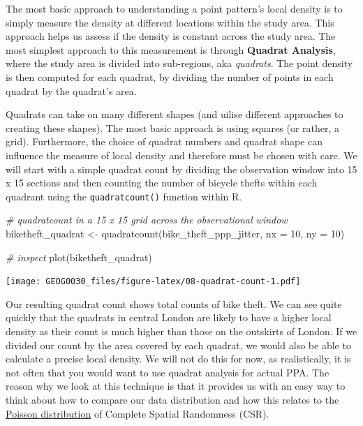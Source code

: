 \documentclass[
]{book}
\newenvironment{Shaded}{\begin{snugshade}}{\end{snugshade}}
\newcommand{\AttributeTok}[1]{\textcolor[rgb]{0.77,0.63,0.00}{#1}}
\newcommand{\CommentTok}[1]{\textcolor[rgb]{0.56,0.35,0.01}{\textit{#1}}}
\newcommand{\DecValTok}[1]{\textcolor[rgb]{0.00,0.00,0.81}{#1}}
\newcommand{\FunctionTok}[1]{\textcolor[rgb]{0.00,0.00,0.00}{#1}}
\newcommand{\NormalTok}[1]{#1}
\newcommand{\OtherTok}[1]{\textcolor[rgb]{0.56,0.35,0.01}{#1}}
\begin{document}
The most basic approach to understanding a point pattern's local density is to simply measure the density at different locations within the study area. This approach helps us assess if the density is constant across the study area. The most simplest approach to this measurement is through \textbf{Quadrat Analysis}, where the study area is divided into sub-regions, aka \emph{quadrats}. The point density is then computed for each quadrat, by dividing the number of points in each quadrat by the quadrat's area.

Quadrats can take on many different shapes (and uilise different approaches to creating these shapes). The most basic approach is using squares (or rather, a grid). Furthermore, the choice of quadrat numbers and quadrat shape can influence the measure of local density and therefore must be chosen with care. We will start with a simple quadrat count by dividing the observation window into 15 x 15 sections and then counting the number of bicycle thefts within each quadrant using the \texttt{quadratcount()} function within R.

\begin{Shaded}
\begin{Highlighting}[]
\CommentTok{\# quadratcount in a 15 x 15 grid across the observational window}
\NormalTok{biketheft\_quadrat }\OtherTok{\textless{}{-}} \FunctionTok{quadratcount}\NormalTok{(bike\_theft\_ppp\_jitter, }\AttributeTok{nx =} \DecValTok{10}\NormalTok{, }\AttributeTok{ny =} \DecValTok{10}\NormalTok{)}

\CommentTok{\# inspect}
\FunctionTok{plot}\NormalTok{(biketheft\_quadrat)}
\end{Highlighting}
\end{Shaded}

\texttt{[image: GEOG0030\_files/figure-latex/08-quadrat-count-1.pdf]}

Our resulting quadrat count shows total counts of bike theft. We can see quite quickly that the quadrats in central London are likely to have a higher local density as their count is much higher than those on the outskirts of London. If we divided our count by the area covered by each quadrat, we would also be able to calculate a precise local density. We will not do this for now, as realistically, it is not often that you would want to use quadrat analysis for actual PPA. The reason why we look at this technique is that it provides us with an easy way to think about how to compare our data distribution and how this relates to the \href{https://en.wikipedia.org/wiki/Poisson_distribution}{Poisson distribution} of Complete Spatial Randomness (CSR).
\end{document}
